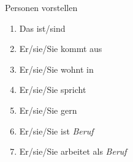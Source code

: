 \begin{discourse}{Personen vorstellen}{}
\begin{enumerate}
	\item Das ist/sind \fillhere
	\item Er/sie/Sie kommt aus \fillhere
	\item Er/sie/Sie wohnt in \fillhere
	\item Er/sie/Sie spricht \fillhere
	\item Er/sie/Sie \verbhere gern \fillhere
	\item Er/sie/Sie ist \textit{Beruf}
	\item Er/sie/Sie arbeitet als \textit{Beruf}
\end{enumerate}
\end{discourse}

